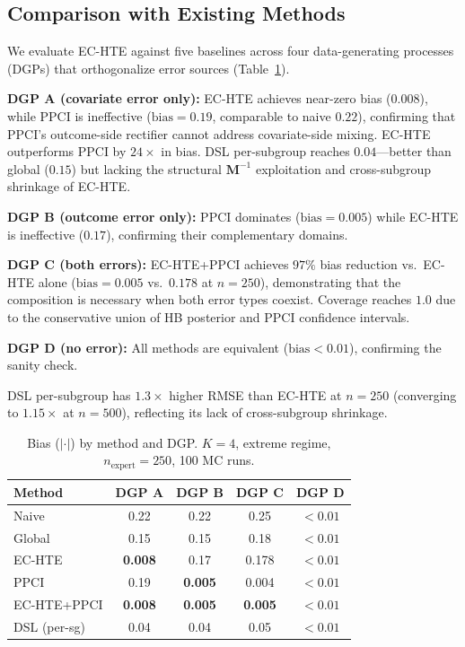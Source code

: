 \documentclass[11pt,twocolumn]{article}
\theoremstyle{remark}
\newcommand{\abs}[1]{\lvert #1 \rvert}
\newcommand{\vect}[1]{\boldsymbol{#1}}
\begin{document}
\subsection{Comparison with Existing Methods}\label{sec:baselines}

We evaluate EC-HTE against five baselines across four data-generating processes (DGPs) that orthogonalize error sources (Table~\ref{tab:dgp}).

\textbf{DGP A (covariate error only):}
EC-HTE achieves near-zero bias ($0.008$), while PPCI is ineffective ($\mathrm{bias}=0.19$, comparable to naive $0.22$), confirming that PPCI's outcome-side rectifier cannot address covariate-side mixing.
EC-HTE outperforms PPCI by $24\times$ in bias.
DSL per-subgroup \cite{egami2024using} reaches $0.04$---better than global ($0.15$) but lacking the structural $\vect{M}^{-1}$ exploitation and cross-subgroup shrinkage of EC-HTE.

\textbf{DGP B (outcome error only):}
PPCI dominates ($\mathrm{bias}=0.005$) while EC-HTE is ineffective ($0.17$), confirming their complementary domains.

\textbf{DGP C (both errors):}
EC-HTE+PPCI achieves $97\%$ bias reduction vs.\ EC-HTE alone ($\mathrm{bias}=0.005$ vs.\ $0.178$ at $n{=}250$), demonstrating that the composition is necessary when both error types coexist.
Coverage reaches $1.0$ due to the conservative union of HB posterior and PPCI confidence intervals.

\textbf{DGP D (no error):}
All methods are equivalent ($\mathrm{bias} < 0.01$), confirming the sanity check.

DSL per-subgroup has $1.3\times$ higher RMSE than EC-HTE at $n{=}250$ (converging to $1.15\times$ at $n{=}500$), reflecting its lack of cross-subgroup shrinkage.

\begin{table}[t]
\centering
\small
\caption{Bias ($\abs{\cdot}$) by method and DGP. $K{=}4$, extreme regime, $n_{\mathrm{expert}}{=}250$, 100 MC runs.}
\label{tab:dgp}
\begin{tabular}{lcccc}
\toprule
Method & DGP A & DGP B & DGP C & DGP D \\
\midrule
Naive & 0.22 & 0.22 & 0.25 & ${<}0.01$ \\
Global & 0.15 & 0.15 & 0.18 & ${<}0.01$ \\
EC-HTE & \textbf{0.008} & 0.17 & 0.178 & ${<}0.01$ \\
PPCI & 0.19 & \textbf{0.005} & 0.004 & ${<}0.01$ \\
EC-HTE+PPCI & \textbf{0.008} & \textbf{0.005} & \textbf{0.005} & ${<}0.01$ \\
DSL (per-sg) & 0.04 & 0.04 & 0.05 & ${<}0.01$ \\
\bottomrule
\end{tabular}
\end{table}
\end{document}
